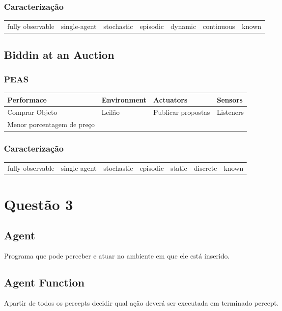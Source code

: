 \documentclass[a4paper,12pt]{article}
\begin{document}
\subsubsection{Caracterização}
\begin{table}[h!]
\begin{tabular}{|c|c|c|c|c|c|c|}
\hline
fully observable & single-agent & stochastic & episodic & dynamic & continuous & known
\end{tabular}
\end{table}

\subsection{Biddin at an Auction}
\subsubsection{PEAS}
\begin{table}[h!]
\begin{tabular}{l|l|l|l}
\hline
Performace & Environment & Actuators & Sensors \\
\hline
Comprar Objeto & Leilão & Publicar propostas & Listeners \\
Menor porcentagem de preço & &  & \\
\end{tabular}
\end{table}
\subsubsection{Caracterização}
\begin{table}[h!]
\begin{tabular}{|c|c|c|c|c|c|c|}
\hline
fully observable & single-agent & stochastic & episodic & static & discrete & known
\end{tabular}
\end{table}

\section{Questão 3}
\subsection{Agent}
Programa que pode perceber e atuar no ambiente em que ele está inserido.
\subsection{Agent Function}
Apartir de todos os percepts decidir qual ação deverá ser executada em terminado percept.
\end{document}
